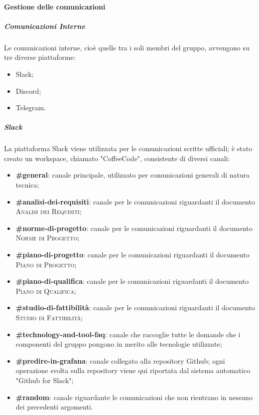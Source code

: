 \documentclass[../norme-di-progetto.tex]{subfiles}
\begin{document}
\paragraph{Gestione delle comunicazioni}
\subparagraph{Comunicazioni Interne}
Le comunicazioni interne, cioè quelle tra i soli membri del gruppo, avvengono su tre diverse piattaforme:
\begin{itemize}
  \item Slack;
  \item Discord;
  \item Telegram.
\end{itemize}
\subparagraph*{Slack}
La piattaforma Slack viene utilizzata per le comunicazioni scritte ufficiali; è stato creato un workspace, chiamato "CoffeeCode", consistente di diversi canali:
\begin{itemize}
  \item \textbf{\#general}: canale principale, utilizzato per comunicazioni generali di natura tecnica;
  \item \textbf{\#analisi-dei-requisiti}: canale per le comunicazioni riguardanti il documento \textsc{Analisi dei Requisiti};
  \item \textbf{\#norme-di-progetto}: canale per le comunicazioni riguardanti il documento \textsc{Norme di Progetto};
  \item \textbf{\#piano-di-progetto}: canale per le comunicazioni riguardanti il documento \textsc{Piano di Progetto};
  \item \textbf{\#piano-di-qualifica}: canale per le comunicazioni riguardanti il documento \textsc{Piano di Qualifica};
  \item \textbf{\#studio-di-fattibilità}: canale per le comunicazioni riguardanti il documento \textsc{Studio di Fattibilità};
  \item \textbf{\#technology-and-tool-faq}: canale che raccoglie tutte le domande che i componenti del gruppo pongono in merito alle tecnologie utilizzate;
  \item \textbf{\#predire-in-grafana}: canale collegato alla repository Github; ogni operazione svolta sulla repository viene qui riportata dal sistema automatico "Github for Slack";
  \item \textbf{\#random}: canale riguardante le comunicazioni che non rientrano in nessuno dei precedenti argomenti.
\end{itemize}
\end{document}
